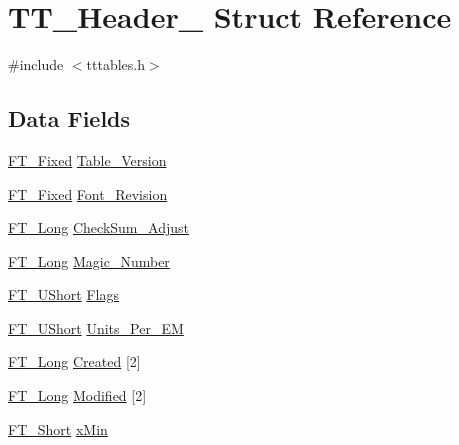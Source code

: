 \hypertarget{struct_t_t___header__}{}\section{T\+T\+\_\+\+Header\+\_\+ Struct Reference}
\label{struct_t_t___header__}


{\ttfamily \#include $<$tttables.\+h$>$}

\subsection*{Data Fields}
\begin{DoxyCompactItemize}
\item 
\hyperlink{fttypes_8h_a5f5a679cc09f758efdd0d1c5feed3c3d}{F\+T\+\_\+\+Fixed} \hyperlink{struct_t_t___header___ab14622e8f8f80ee8361f4847cf9c36e1}{Table\+\_\+\+Version}
\item 
\hyperlink{fttypes_8h_a5f5a679cc09f758efdd0d1c5feed3c3d}{F\+T\+\_\+\+Fixed} \hyperlink{struct_t_t___header___aa5d0f9f88a7ffc755982a1a9dbb58f21}{Font\+\_\+\+Revision}
\item 
\hyperlink{fttypes_8h_a7fa72a1f0e79fb1860c5965789024d6f}{F\+T\+\_\+\+Long} \hyperlink{struct_t_t___header___a5ca008fa01e9568769287febc2abd807}{Check\+Sum\+\_\+\+Adjust}
\item 
\hyperlink{fttypes_8h_a7fa72a1f0e79fb1860c5965789024d6f}{F\+T\+\_\+\+Long} \hyperlink{struct_t_t___header___a24e0dde7596c7303c8b8872feb1c221f}{Magic\+\_\+\+Number}
\item 
\hyperlink{fttypes_8h_a937f6c17cf5ffd09086d8610c37b9f58}{F\+T\+\_\+\+U\+Short} \hyperlink{struct_t_t___header___a9e81d0e6bf9a83ebf28f768d83559f38}{Flags}
\item 
\hyperlink{fttypes_8h_a937f6c17cf5ffd09086d8610c37b9f58}{F\+T\+\_\+\+U\+Short} \hyperlink{struct_t_t___header___a594567319e6b6b5a823567279d26857d}{Units\+\_\+\+Per\+\_\+\+EM}
\item 
\hyperlink{fttypes_8h_a7fa72a1f0e79fb1860c5965789024d6f}{F\+T\+\_\+\+Long} \hyperlink{struct_t_t___header___a1e5d99f35ae2a604c6f54da94dc5105f}{Created} \mbox{[}2\mbox{]}
\item 
\hyperlink{fttypes_8h_a7fa72a1f0e79fb1860c5965789024d6f}{F\+T\+\_\+\+Long} \hyperlink{struct_t_t___header___a48db8e244aee26da683240e67644619e}{Modified} \mbox{[}2\mbox{]}
\item 
\hyperlink{fttypes_8h_aa7279be89046a2563cd3d4d6651fbdcf}{F\+T\+\_\+\+Short} \hyperlink{struct_t_t___header___ae4553d76427d9f7a28595ed71897dcbb}{x\+Min}

\end{DoxyCompactItemize}
